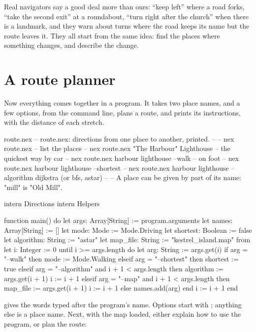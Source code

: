 Real navigators say a good deal more than ours: ``keep left'' where a road
forks, ``take the second exit'' at a roundabout, ``turn right after the
church'' when there is a landmark, and they warn about turns where the road
keeps its name but the route leaves it. They all start from the same idea:
find the places where something changes, and describe the change.

\section{A route planner}

Now everything comes together in a program. It takes two place names, and
a few options, from the command line, plans a route, and prints its
instructions, with the distance of each stretch.

\begin{newfile}{route.nex}
-- route.nex: directions from one place to another, printed.
--
--   nex route.nex                              -- list the places
--   nex route.nex "The Harbour" Lighthouse     -- the quickest way by car
--   nex route.nex harbour lighthouse --walk    -- on foot
--   nex route.nex harbour lighthouse --shortest
--   nex route.nex harbour lighthouse --algorithm dijkstra   (or bfs, astar)
--
-- A place can be given by part of its name: "mill" is "Old Mill".

intern Directions
intern Helpers

function main() do
  let args: Array[String] := program.arguments
  let names: Array[String] := []
  let mode: Mode := Mode.Driving
  let shortest: Boolean := false
  let algorithm: String := "astar"
  let map_file: String := "kestrel_island.map"
  from
    let i: Integer := 0
  until
    i >= args.length
  do
    let arg: String := args.get(i)
    if arg = "--walk" then
      mode := Mode.Walking
    elseif arg = "--shortest" then
      shortest := true
    elseif arg = "--algorithm" and i + 1 < args.length then
      algorithm := args.get(i + 1)
      i := i + 1
    elseif arg = "--map" and i + 1 < args.length then
      map_file := args.get(i + 1)
      i := i + 1
    else
      names.add(arg)
    end
    i := i + 1
  end
\end{newfile}

 gives the words typed after the
program's name. Options start with \code{--}; anything else is a place
name. Next, with the map loaded, either explain how to use the program,
or plan the route:

